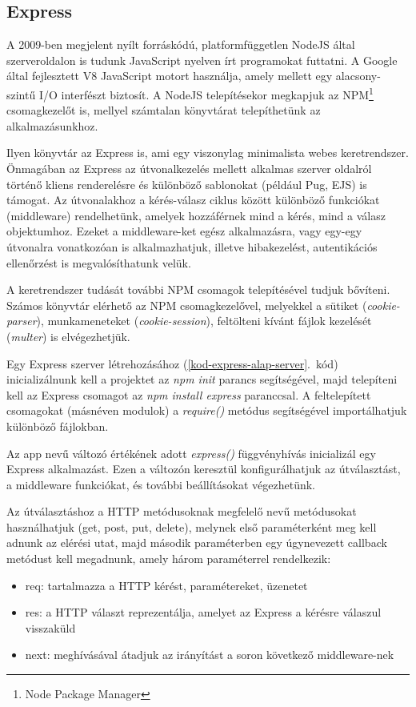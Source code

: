 \documentclass[
]{thesis-ekf}
\theoremstyle{definition}
\theoremstyle{remark}
\begin{document}
	\subsection[Express]{Express\cite{expressnodeintro}\cite{expressdocs}}
	A 2009-ben megjelent nyílt forráskódú, platformfüggetlen NodeJS által szerveroldalon is tudunk JavaScript nyelven írt programokat futtatni. A Google által fejlesztett V8 JavaScript motort használja, amely mellett egy alacsony-szintű I/O interfészt biztosít. A NodeJS telepítésekor megkapjuk az NPM\footnote{Node Package Manager} csomagkezelőt is, mellyel számtalan könyvtárat telepíthetünk az alkalmazásunkhoz.
	
	Ilyen könyvtár az Express is, ami egy viszonylag minimalista webes keretrendszer. Önmagában az Express az útvonalkezelés mellett alkalmas szerver oldalról történő kliens renderelésre és különböző sablonokat (például Pug, EJS) is támogat. Az útvonalakhoz a kérés-válasz ciklus között különböző funkciókat (middleware) rendelhetünk, amelyek hozzáférnek mind a kérés, mind a válasz objektumhoz. Ezeket a middleware-ket egész alkalmazásra, vagy egy-egy útvonalra vonatkozóan is alkalmazhatjuk, illetve hibakezelést, autentikációs ellenőrzést is megvalósíthatunk velük. 
	
	A keretrendszer tudását további NPM csomagok telepítésével tudjuk bővíteni. Számos könyvtár elérhető az NPM csomagkezelővel, melyekkel a sütiket (\emph{cookie-parser}), munkameneteket (\emph{cookie-session}), feltölteni kívánt fájlok kezelését (\emph{multer}) is elvégezhetjük.

	
	
	Egy Express szerver létrehozásához (\ref{kod-express-alap-server}.~kód) inicializálnunk kell a projektet az \emph{npm init} parancs segítségével, majd telepíteni kell az Express csomagot az \emph{npm install express} paranccsal. A feltelepített csomagokat (másnéven modulok) a \emph{require()} metódus segítségével importálhatjuk különböző fájlokban.
	
	Az app nevű változó értékének adott \emph{express()} függvényhívás inicializál egy Express alkalmazást. Ezen a változón keresztül konfigurálhatjuk az útválasztást, a middleware funkciókat, és további beállításokat végezhetünk.
	
	Az útválasztáshoz a HTTP metódusoknak megfelelő nevű metódusokat használhatjuk (get, post, put, delete), melynek első paraméterként meg kell adnunk az elérési utat, majd második paraméterben egy úgynevezett callback metódust kell megadnunk, amely három paraméterrel rendelkezik:
	\begin{itemize}
		\item req: tartalmazza a HTTP kérést, paramétereket, üzenetet
		\item res: a HTTP választ reprezentálja, amelyet az Express a kérésre válaszul visszaküld
		\item next: meghívásával átadjuk az irányítást a soron következő middleware-nek
	\end{itemize}
	
\end{document}
